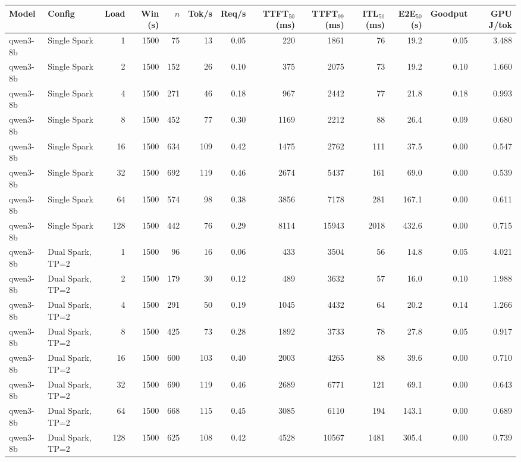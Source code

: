 \begin{tabular}{l l r r r r r r r r r r r}
\toprule
Model & Config & Load & Win (s) & $n$ & Tok/s & Req/s & TTFT$_{50}$ (ms) & TTFT$_{99}$ (ms) & ITL$_{50}$ (ms) & E2E$_{50}$ (s) & Goodput & GPU J/tok \\
\midrule
qwen3-8b & Single Spark & 1 & 1500 & 75\rlap{$^\dagger$} & 13 & 0.05 & 220 & 1861 & 76 & 19.2 & 0.05 & 3.488 \\
qwen3-8b & Single Spark & 2 & 1500 & 152 & 26 & 0.10 & 375 & 2075 & 73 & 19.2 & 0.10 & 1.660 \\
qwen3-8b & Single Spark & 4 & 1500 & 271 & 46 & 0.18 & 967 & 2442 & 77 & 21.8 & 0.18 & 0.993 \\
qwen3-8b & Single Spark & 8 & 1500 & 452 & 77 & 0.30 & 1169 & 2212 & 88 & 26.4 & 0.09 & 0.680 \\
qwen3-8b & Single Spark & 16 & 1500 & 634 & 109 & 0.42 & 1475 & 2762 & 111 & 37.5 & 0.00 & 0.547 \\
qwen3-8b & Single Spark & 32 & 1500 & 692 & 119 & 0.46 & 2674 & 5437 & 161 & 69.0 & 0.00 & 0.539 \\
qwen3-8b & Single Spark & 64 & 1500 & 574 & 98 & 0.38 & 3856 & 7178 & 281 & 167.1 & 0.00 & 0.611 \\
qwen3-8b & Single Spark & 128 & 1500 & 442 & 76 & 0.29 & 8114 & 15943 & 2018 & 432.6 & 0.00 & 0.715 \\
\addlinespace
qwen3-8b & Dual Spark, TP=2 & 1 & 1500 & 96\rlap{$^\dagger$} & 16 & 0.06 & 433 & 3504 & 56 & 14.8 & 0.05 & 4.021 \\
qwen3-8b & Dual Spark, TP=2 & 2 & 1500 & 179 & 30 & 0.12 & 489 & 3632 & 57 & 16.0 & 0.10 & 1.988 \\
qwen3-8b & Dual Spark, TP=2 & 4 & 1500 & 291 & 50 & 0.19 & 1045 & 4432 & 64 & 20.2 & 0.14 & 1.266 \\
qwen3-8b & Dual Spark, TP=2 & 8 & 1500 & 425 & 73 & 0.28 & 1892 & 3733 & 78 & 27.8 & 0.05 & 0.917 \\
qwen3-8b & Dual Spark, TP=2 & 16 & 1500 & 600 & 103 & 0.40 & 2003 & 4265 & 88 & 39.6 & 0.00 & 0.710 \\
qwen3-8b & Dual Spark, TP=2 & 32 & 1500 & 690 & 119 & 0.46 & 2689 & 6771 & 121 & 69.1 & 0.00 & 0.643 \\
qwen3-8b & Dual Spark, TP=2 & 64 & 1500 & 668 & 115 & 0.45 & 3085 & 6110 & 194 & 143.1 & 0.00 & 0.689 \\
qwen3-8b & Dual Spark, TP=2 & 128 & 1500 & 625 & 108 & 0.42 & 4528 & 10567 & 1481 & 305.4 & 0.00 & 0.739 \\

\end{tabular}
